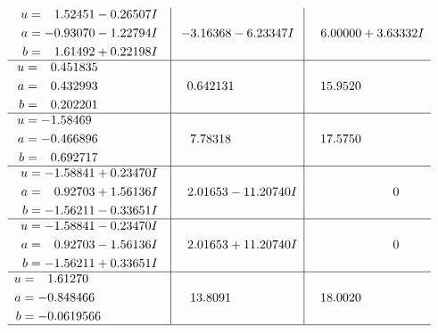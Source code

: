 \documentclass[1p]{elsarticle_modified}
\theoremstyle{definition}
\begin{document}
$$\begin{array}{c|c|c}
\begin{aligned}
u &= \phantom{-}1.52451 - 0.26507 I \\
a &= -0.93070 - 1.22794 I \\
b &= \phantom{-}1.61492 + 0.22198 I\end{aligned}
 & -3.16368 - 6.23347 I & \phantom{-}6.00000 + 3.63332 I \\ \hline\begin{aligned}
u &= \phantom{-}0.451835\phantom{ +0.000000I} \\
a &= \phantom{-}0.432993\phantom{ +0.000000I} \\
b &= \phantom{-}0.202201\phantom{ +0.000000I}\end{aligned}
 & \phantom{-}0.642131\phantom{ +0.000000I} & \phantom{-}15.9520\phantom{ +0.000000I} \\ \hline\begin{aligned}
u &= -1.58469\phantom{ +0.000000I} \\
a &= -0.466896\phantom{ +0.000000I} \\
b &= \phantom{-}0.692717\phantom{ +0.000000I}\end{aligned}
 & \phantom{-}7.78318\phantom{ +0.000000I} & \phantom{-}17.5750\phantom{ +0.000000I} \\ \hline\begin{aligned}
u &= -1.58841 + 0.23470 I \\
a &= \phantom{-}0.92703 + 1.56136 I \\
b &= -1.56211 - 0.33651 I\end{aligned}
 & \phantom{-}2.01653 - 11.20740 I & \phantom{-0.000000 } 0 \\ \hline\begin{aligned}
u &= -1.58841 - 0.23470 I \\
a &= \phantom{-}0.92703 - 1.56136 I \\
b &= -1.56211 + 0.33651 I\end{aligned}
 & \phantom{-}2.01653 + 11.20740 I & \phantom{-0.000000 } 0 \\ \hline\begin{aligned}
u &= \phantom{-}1.61270\phantom{ +0.000000I} \\
a &= -0.848466\phantom{ +0.000000I} \\
b &= -0.0619566\phantom{ +0.000000I}\end{aligned}
 & \phantom{-}13.8091\phantom{ +0.000000I} & \phantom{-}18.0020\phantom{ +0.000000I}\\
 \hline 
 \end{array}$$\newpage$$\begin{array}{c|c|c}  

\end{array}$$
\end{document}
